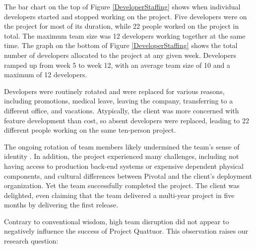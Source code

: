 The bar chart on the top of Figure \ref{DeveloperStaffing} shows when individual developers started and stopped working on the project. Five developers were on the project for most of its duration, while 22 people worked on the project in total. The maximum team size was 12 developers working together at the same time. The graph on the bottom of Figure \ref{DeveloperStaffing} shows the total number of developers allocated to the project at any given week. Developers ramped up from week 5 to week 12, with an average team size of 10 and a maximum of 12 developers.

Developers were routinely rotated and were replaced for various reasons, including promotions, medical leave, leaving the company, transferring to a different office, and vacations. Atypically, the client was more concerned with feature development than cost, so absent developers were replaced, leading to 22 different people working on the same ten-person project. 

The ongoing rotation of team members likely undermined the team’s sense of identity \cite{TuckmanModel}. In addition, the project experienced many challenges, including not having access to production back-end systems or expensive dependent physical components, and cultural differences between Pivotal and the client's deployment organization. Yet the team successfully completed the project. The client was delighted, even claiming that the team delivered a multi-year project in five months by delivering the first release. 

Contrary to conventional wisdom, high team disruption did not appear to negatively influence the success of Project Quattuor. This observation raises our research question: 



